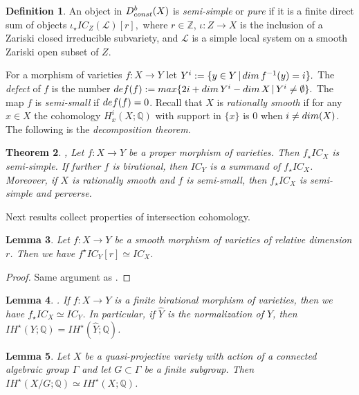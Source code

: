\documentclass[11pt, reqno]{amsart}
\theoremstyle{plain}
\newtheorem{theorem}{Theorem}[section]
\newtheorem{lemma}[theorem]{Lemma}
\theoremstyle{definition}
\newtheorem{definition}[theorem]{Definition}
\theoremstyle{remark}
\begin{document}
\begin{definition}\label{def2}
An object in $D^{b}_{\rm const}(X)$ is \emph{semi-simple} or \emph{pure} \cite[Section 5.4]{BBD82} if it is a finite direct sum
of objects  $\iota_ {\star}IC_{Z}(\mathscr{L})[r],$
where $r\in \mathbb{Z}$, $\iota: Z\rightarrow X$ is the inclusion of  a Zariski closed irreducible subvariety,  and $\mathscr{L}$ is a simple local system on a smooth Zariski open subset of $Z$. 
\end{definition}
For a morphism of varieties $f:X\rightarrow Y$
let $Y^{i}:= \{y\in Y\,|\, {\rm dim}\, f^{-1}(y) = i\}.$ The \emph{defect}
of $f$ is the number 
${\rm def}(f):= {\rm max}\{2i + {\rm dim}\, Y^{i}- {\rm dim}\, X\,|\, Y^{i}\neq \emptyset\}.$
The map $f$ is \emph{semi-small} if ${\rm def}(f) = 0$. Recall that $X$ is \emph{rationally smooth} if for any $x\in X$ the cohomology $H^{i}_{x}(X; \mathbb{Q})$ with support in $\{x\}$ is $0$ when $i\neq {\rm dim}(X)$. 
The following is the \emph{decomposition theorem}.
\begin{theorem}\cite[Theorem 6.25]{BBD82}, \cite[Theorem 2.4]{Wil17}
Let $f:X\rightarrow Y$ be a proper morphism of varieties. Then
$f_{\star} IC_{X}$ is semi-simple. If further $f$ is birational, then $IC_{Y}$ is a summand of $f_{\star}IC_{X}$. Moreover, if $X$ is rationally smooth and $f$ is semi-small, then $f_{\star} IC_{X}$ is semi-simple and perverse.
\end{theorem}
Next results collect  properties of intersection cohomology.
\begin{lemma}\label{lemma-smooth}
Let $f: X\rightarrow Y$ be a smooth morphism of varieties of relative dimension $r$.
Then we have $f^{\star}IC_{Y}[r]\simeq IC_{X}$. 
\end{lemma}
\begin{proof}
Same argument as \cite[Lemma 2.4]{AL18}.
\end{proof}
\begin{lemma}\label{LelENORMAphhh}\cite[Section 5, Lemma 1]{GS93}.
If $f:X\rightarrow Y$ is a finite birational morphism of varieties, then we have $f_{\star}IC_{X}\simeq IC_{Y}$. In particular, if $\widehat{Y}$
is the normalization of $Y$, then $IH^{\star}(Y; \mathbb{Q}) =  IH^{\star}(\widehat{Y}; \mathbb{Q})$.
\end{lemma}
\begin{lemma}\label{GtrivGtrivlemma}
Let $X$ be a quasi-projective variety with action of a connected algebraic group $\Gamma$ and let
$G\subset \Gamma$ be a finite subgroup. Then $IH^{\star}(X/G; \mathbb{Q})\simeq IH^{\star}(X; \mathbb{Q})$.
\end{lemma}
\end{document}
